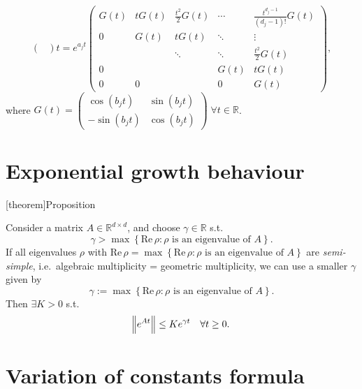 \documentclass[12pt]{report}
\theoremstyle{definition}
\begin{document}
\begin{matrix exponential form}
\begin{enumerate}[label = (\roman*)]
\[{\begin{pmatrix}
                \end{pmatrix}t}
                = e^{a_jt}
                \begin{pmatrix}
                    G(t) & tG(t) & \frac{t^{2}}{2}G(t) & \cdots & \frac{t^{d_j-1}}{(d_j-1)!}G(t) \\
                    0 & G(t) & tG(t) & \ddots & \vdots \\
                      &   & \ddots & \ddots & \frac{t^{2}}{2}G(t) \\
                    0 &   &   & G(t) & tG(t) \\
                    0 & 0 &   & 0 & G(t)
                \end{pmatrix},
            \]
            where $G(t)=\begin{pmatrix}
                \cos(b_jt) & \sin(b_jt) \\
                -\sin(b_jt) & \cos(b_jt)
            \end{pmatrix} \;\forall t \in \mathbb{R}$.
    \end{enumerate} 
\end{matrix exponential form}

\section{Exponential growth behaviour}

[theorem]{Proposition}
\begin{Exp estimate for the matrix exp function}
    Consider a matrix $A\in\mathbb{R}^{d\times d}$, and choose
    $\gamma\in\mathbb{R}$ s.t.
    \[
        \gamma>\max\left\{\text{Re}\,\rho:\rho\text{ is an eigenvalue of }A\right\}.
    \]
    If all eigenvalues $\rho$ with
    $\text{Re}\,\rho=\max\left\{\text{Re}\,\rho:\rho\text{ is an eigenvalue of
    }A\right\}$ are \emph{semi-simple}, i.e.\ algebraic multiplicity = geometric
    multiplicity, we can use a smaller $\gamma$ given by
    \[
        \gamma := \max\left\{\text{Re}\,\rho:\rho\text{ is an eigenvalue of
        }A\right\}.
    \]
    Then $\exists K>0$ s.t.
    \[
        \norm{e^{At}}\le Ke^{\gamma t}\quad\forall t\ge 0.
    \]
\end{Exp estimate for the matrix exp function}

\section{Variation of constants formula}
\end{document}
